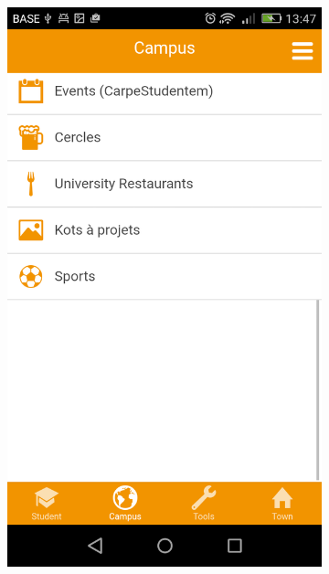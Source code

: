 \documentclass{eplmastersthesis}
\begin{document}
\begin{figure}
    \centering
\begin{subfigure}[b]{0.3\textwidth}
        \includegraphics[width=\textwidth]{Images/Application_screens/Screenshot_2016-06-06-13-47-05.png}
    \end{subfigure}
    ~ %
    \begin{subfigure}[b]{0.3\textwidth}

\end{subfigure}
\end{figure}
\end{document}
